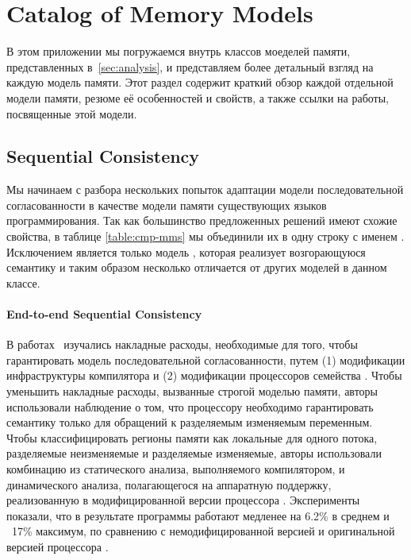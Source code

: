 \section{Catalog of Memory Models}
\label{sec:catalog}

В этом приложении мы погружаемся внутрь классов 
моеделей памяти, представленных в~\cref{sec:analysis},
и представляем более детальный взгляд на каждую модель памяти.
Этот раздел содержит краткий обзор каждой отдельной модели памяти, 
резюме её особенностей и свойств, а также ссылки на работы, 
посвященные этой модели.   
 
\subsection{Sequential Consistency}
\label{sec:catalog:sc}

Мы начинаем с разбора нескольких попыток 
адаптации модели последовательной согласованности 
в качестве модели памяти существующих языков программирования. 
Так как большинство предложенных решений имеют 
схожие свойства, в таблице \cref{table:cmp-mms} 
мы объединили их в одну строку с именем \SC. 
Исключением является только модель \DRFx,
которая реализует возгорающуюся семантику 
и таким образом несколько отличается от других моделей в данном классе. 

\paragraph{End-to-end Sequential Consistency}

В работах~\cite{Marino-al:PLDI11, Singh-al:ISCA12} 
изучались накладные расходы, необходимые для того, 
чтобы гарантировать модель последовательной согласованности, 
путем (1) модификации инфраструктуры компилятора \LLVM и 
(2) модификации процессоров семейства \Intel.
Чтобы уменьшить накладные расходы, вызванные строгой моделью памяти, 
авторы использовали наблюдение о том, что 
процессору необходимо гарантировать семантику \SC 
только для обращений к разделяемым изменяемым переменным. 
Чтобы классифицировать регионы памяти как 
локальные для одного потока, разделяемые неизменяемые 
и разделяемые изменяемые, авторы использовали 
комбинацию из статического анализа, выполняемого компилятором, 
и динамического анализа, полагающегося на аппаратную поддержку, 
реализованную в модифицированной версии процессора \Intel. 
Эксперименты показали, что в результате программы 
работают медленее на 6.2\% в среднем и ~17\% максимум, 
по сравнению с немодифицированной версией \LLVM
и оригинальной версией процессора \Intel.

